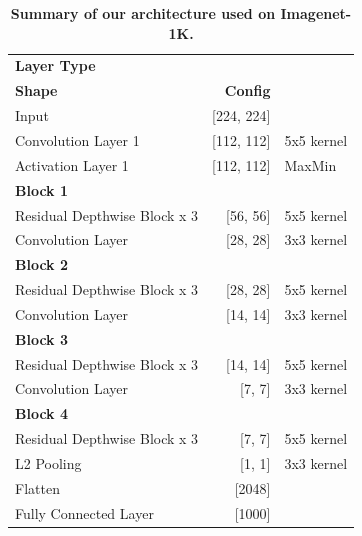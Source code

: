     \begin{table}%
        \centering
        \begin{tabular}{lrl}
        \hline
        \textbf{Layer Type}             & \makecell{\textbf{Output}\\\textbf{Shape}} & \textbf{Config} \\ \hline
        Input                           & [224, 224]                 & \\ \hline
        Convolution Layer 1             & [112, 112]               & 5x5 kernel \\ 
        Activation Layer 1              & [112, 112]               & MaxMin \\ \hline
        \textbf{Block 1}                &                               & \\ 
        Residual Depthwise Block x 3    & [56, 56]                 & 5x5 kernel \\ 
        Convolution Layer               & [28, 28]                 & 3x3 kernel \\ \hline
        \textbf{Block 2}                &                               & \\ 
        Residual Depthwise Block x 3    & [28, 28]                 & 5x5 kernel \\ 
        Convolution Layer               & [14, 14]                & 3x3 kernel \\ \hline
        \textbf{Block 3}                &                               & \\ 
        Residual Depthwise Block x 3    & [14, 14]                & 5x5 kernel \\ 
        Convolution Layer               & [7, 7]                  & 3x3 kernel \\ \hline
        \textbf{Block 4}                &                               & \\ 
        Residual Depthwise Block x 3    & [7, 7]                  & 5x5 kernel \\ \hline
        L2 Pooling                      & [1, 1]                  & 3x3 kernel \\ 
        Flatten                         & [2048]                        &  \\ 
        Fully Connected Layer           & [1000]                        &  \\ \hline
        \end{tabular}
        \caption{\textbf{Summary of our architecture used on Imagenet-1K.}}
        \label{tab:splitconcatnet_architecture}
    \end{table}

